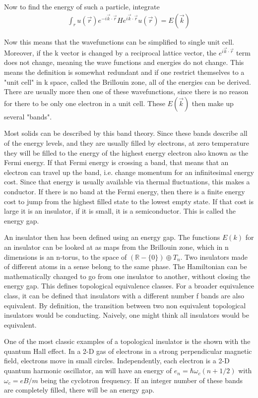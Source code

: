Now to find the energy of such a particle, integrate  
\begin{align}
\int_r u(\vec{r}) e^{-i \vec{k} \cdot \vec{r}} H e^{i \vec{k} \cdot \vec{r}} u(\vec{r}) = E(\vec{k})
\end{align}

Now this means that the wavefunctions can be simplified to single unit cell. Moreover, if the k vector is changed by a reciprocal lattice vector, the $e^{i \vec{k} \cdot \vec{r}}$ term does not change, meaning the wave functions and energies do not change. This means the definition is somewhat redundant and if one restrict themselves to a "unit cell" in k space, called the Brillouin zone, all of the energies can be derived. There are usually more then one of these wavefunctions, since there is no reason for there to be only one electron in a unit cell. These $E(\vec{k})$ then make up several "bands".

Most solids can be described by this band theory. Since these bands describe all of the energy levels, and they are usually filled by electrons, at zero temperature they will be filled to the energy of the highest energy electron also known as the Fermi energy. If that Fermi energy is crossing a band, that means that an electron can travel up the band, i.e. change momentum for an infinitesimal energy cost. Since that energy is usually available via thermal fluctuations, this makes a conductor. If there is no band at the Fermi energy, then there is a finite energy cost to jump from the highest filled state to the lowest empty state. If that cost is large it is an insulator, if it is small, it is a semiconductor. This is called the energy gap. 

An insulator then has been defined using an energy gap. The functions $E(k)$ for an insulator can be looked at as maps from the Brillouin zone, which in n dimensions is an n-torus, to the space of $(\mathbb{R}-\{0\}) \oplus T_n $. Two insulators made of different atoms in a sense belong to the same phase. The Hamiltonian can be mathematically changed to go from one insulator to another, without closing the energy gap. This defines topological equivalence classes. For a broader equivalence class, it can be defined that insulators with a different number f bands are also equivalent. By definition, the transition between two non equivalent topological insulators would be conducting. Naively, one might think all insulators would be equivalent. 

One of the most classic examples of a topological insulator is the shown with the quantum Hall effect. In a 2-D gas of electrons in a strong perpendicular magnetic field, electrons move in small circles. Independently, each electron is a 2-D quantum harmonic oscillator, an will have an energy of $e_n = \hbar \omega_c(n + 1/2)$ with $\omega_c = eB/m$ being the cyclotron frequency. If an integer number of these bands are completely filled, there will be an energy gap.

